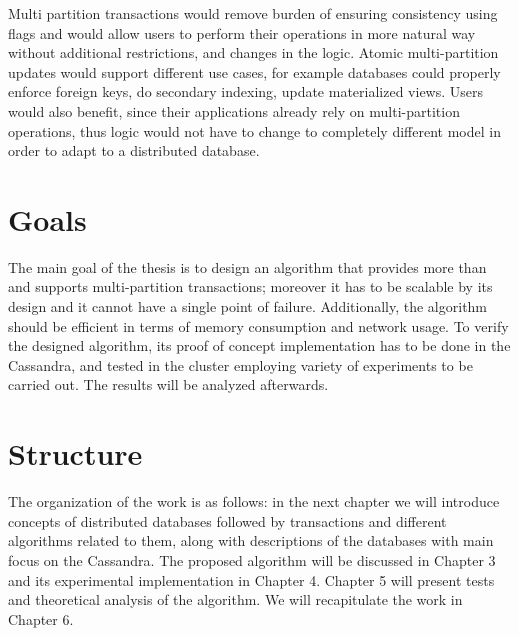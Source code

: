 Multi partition transactions would remove burden of ensuring consistency using flags and would allow users to perform their operations in more natural way without additional restrictions, and changes in the logic. 
Atomic multi-partition updates would support different use cases, for example databases could properly enforce foreign keys, do secondary indexing, update materialized views. Users would also benefit, since their applications already rely on multi-partition operations, thus logic would not have to change to completely different model in order to adapt to a distributed database. 

\section{Goals}
The main goal of the thesis is to design an algorithm that provides more than \lwt and supports multi-partition transactions; moreover it has to be scalable by its design and it cannot have a single point of failure. Additionally, the algorithm should be efficient in terms of memory consumption and network usage. To verify the designed algorithm, its proof of concept implementation has to be done in the Cassandra, and tested in the cluster employing variety of experiments to be carried out. The results will be analyzed afterwards.

\section{Structure}\label{sec:introduction:structure}
The organization of the work is as follows: 
in the next chapter we will introduce concepts of distributed databases followed by transactions and different algorithms related to them, along with descriptions of the databases with main focus on the Cassandra. 
The proposed algorithm will be discussed in Chapter 3 and its experimental implementation in Chapter 4.
Chapter 5 will present tests and theoretical analysis of the algorithm.
We will recapitulate the work in Chapter 6.


